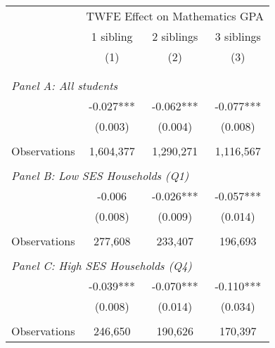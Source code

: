 \makeatletter
{}
{
\makeatother
\begin{tabular}{lccc}
\toprule
\cmidrule(lr){2-4}
& \multicolumn{3}{c}{TWFE Effect on Mathematics GPA} \\
\cmidrule(lr){2-4}
& 1 sibling & 2 siblings & 3 siblings  \\
\cmidrule(lr){2-2} \cmidrule(lr){3-3} \cmidrule(lr){4-4}
& (1) & (2) & (3)\\
\bottomrule
&  &  &  \\
&  &  &   \\
\multicolumn{4}{l}{\textit{Panel A: All students}} \\
\hspace{3mm}        &      -0.027***&      -0.062***&      -0.077***\\
                    &     (0.003)   &     (0.004)   &     (0.008)   \\
                    &               &               &               \\
\hspace{3mm}Observations&   1,604,377   &   1,290,271   &   1,116,567   \\
 
&  &  &   \\
\multicolumn{4}{l}{\textit{Panel B: Low SES Households (Q1)}} \\
\hspace{3mm}        &      -0.006   &      -0.026***&      -0.057***\\
                    &     (0.008)   &     (0.009)   &     (0.014)   \\
                    &               &               &               \\
\hspace{3mm}Observations&     277,608   &     233,407   &     196,693   \\
 
&  &  &   \\
\multicolumn{4}{l}{\textit{Panel C: High SES Households (Q4)}} \\
\hspace{3mm}        &      -0.039***&      -0.070***&      -0.110***\\
                    &     (0.008)   &     (0.014)   &     (0.034)   \\
                    &               &               &               \\
\hspace{3mm}Observations&     246,650   &     190,626   &     170,397   \\
 

\end{tabular}}
